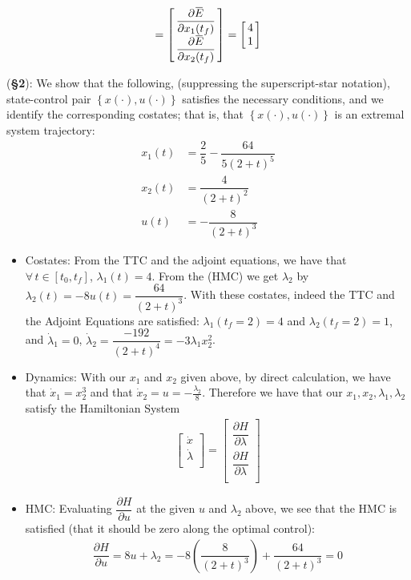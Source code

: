 \documentclass[10pt]{article}
\newcommand{\mat}[2][ccccccccccccccc]{\left [\!\!\begin{array}{#1} #2\\ \end{array} \!\!\right]}
\newcommand{\pdfrac}[2]{\!\left(\dfrac{#1}{#2}\right)\! }
\newcommand{\libzptrl}[2]{\dfrac{\partial #1}{\partial #2} }
\newcommand{\cbrace}[1]{\left\{#1\right\}}				%
\newcommand{\overbar}[1]{\mkern 1.5mu\overline{\mkern-1.5mu#1\mkern-1.5mu}\mkern 1.5mu}
\begin{document}
\begin{enumerate}[leftmargin=*]
\begin{enumerate}
\begin{align*}
                                = \mat{\libzptrl{\overbar E}{x_1(t_f)} \\ \libzptrl{\overbar E}{x_2(t_f)}}
                                = \mat{4 \\ 1}
                    \end{align*}
       \end{enumerate}
       (\textbf{\S2}): We show that the following, (suppressing the superscript-star notation), state-control pair $\cbrace{x(\cdot),u(\cdot)}$ satisfies the necessary conditions, and we identify the corresponding costates; that is, that $\cbrace{x(\cdot),u(\cdot)}$ is an extremal system trajectory:
       \begin{align*}
        x_1(t) &= \dfrac{2}{5} - \dfrac{64}{5(2+t)^5}\\
        x_2(t) &= \dfrac{4}{(2+t)^2}\\
        u(t)  &= -\dfrac{8}{(2+t)^3}
       \end{align*}
       \begin{itemize}
         \item Costates: From the TTC and the adjoint equations, we have that $\forall \, t\in[t_0,t_f]$, $\lambda_1(t)=4$.  From the (HMC) we get $\lambda_2$ by $\lambda_2(t) = -8u(t) = \dfrac{64}{(2+t)^3}$.  With these costates, indeed the TTC and the Adjoint Equations are satisfied: $\lambda_1(t_f=2)=4$ and $\lambda_2(t_f=2)=1$, and $\dot\lambda_1=0$, $\dot\lambda_2=\dfrac{-192}{(2+t)^4}=-3\lambda_1 x_2^2$.
         \item Dynamics:  With our $x_1$ and $x_2$ given above, by direct calculation, we have that $\dot x_1=x_2^3$ and that
               $\dot x_2 = u = -\frac{\lambda_2}{8}$.  Therefore we have that our $x_1,x_2,\lambda_1,\lambda_2$ satisfy the Hamiltonian System
               \begin{align*}
                \mat{\dot x \\ \dot \lambda} = \mat{\libzptrl{H}{\lambda} \\ \libzptrl{H}{\lambda}}
               \end{align*}
         \item  HMC:  Evaluating $\libzptrl{H}{u}$ at the given $u$ and $\lambda_2$ above, we see that the HMC is satisfied (that it should be zero along the optimal control):
                \begin{align*}
                    \libzptrl{H}{u} = 8u+\lambda_2 = -8\pdfrac{8}{(2+t)^3} + \dfrac{64}{(2+t)^3} = 0
                \end{align*}

\end{itemize}
\end{enumerate}
\end{document}
